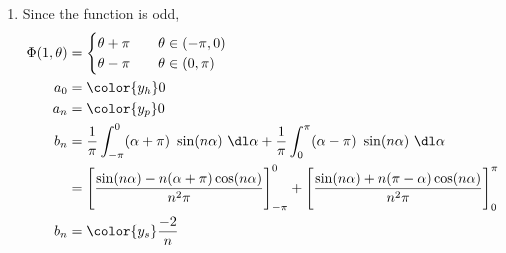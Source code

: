 \begin{enumerate}
    \item Since the function is odd,
          \begin{align}
              \Phi(1, \theta) & = \begin{cases}
                                      \theta + \pi & \quad \theta \in (-\pi, 0) \\
                                      \theta - \pi & \quad \theta \in (0, \pi)  \\
                                  \end{cases}    \\
              a_0             & = \color{y_h} 0                                \\
              a_n             & = \color{y_p} 0                                \\
              b_n             & = \frac{1}{\pi} \int_{-\pi}^{0} (\alpha + \pi)
              \ \sin(n\alpha)\ \dl \alpha
              + \frac{1}{\pi} \int_{0}^{\pi} (\alpha - \pi)\ \sin(n\alpha)
              \ \dl \alpha                                                     \\
                              & = \Bigg[ \frac{\sin(n\alpha) - n(\alpha + \pi)
                      \cos(n\alpha)}{n^2 \pi} \Bigg]_{-\pi}^0
              + \Bigg[ \frac{\sin(n\alpha) + n(\pi - \alpha)
              \cos(n\alpha)}{n^2 \pi} \Bigg]_{0}^\pi                           \\
              b_n             & = \color{y_s} \frac{-2}{n}
          \end{align}


\end{enumerate}
